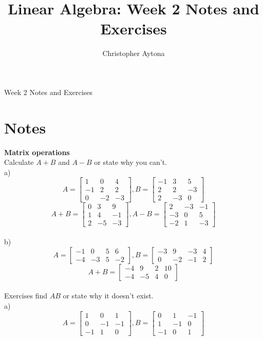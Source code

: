 \documentclass[a4paper]{article}
\title{Linear Algebra: Week 2 Notes and Exercises}
\author{Christopher Aytona}
\begin{document}
\begin{center}
\Huge{Week 2 Notes and Exercises}
\end{center}

\section{Notes}
\textbf{Matrix operations}\\

Calculate $A+B$ and $A-B$ or state why you can't.\\

a) \[ A=
\begin{bmatrix}
1&0&4\\
-1&2&2\\
0&-2&-3
\end{bmatrix},
B=
\begin{bmatrix}
-1&3&5\\
2&2&-3\\
2&-3&0
\end{bmatrix}
\]
\[ A+B=
\begin{bmatrix}
0&3&9\\
1&4&-1\\
2&-5&-3
\end{bmatrix},
A-B=
\begin{bmatrix}
2&-3&-1\\
-3&0&5\\
-2&1&-3
\end{bmatrix}
\]\\

b) \[ A=
\begin{bmatrix}
-1&0&5&6\\
-4&-3&5&-2
\end{bmatrix},
B=
\begin{bmatrix}
-3&9&-3&4\\
0&-2&-1&2
\end{bmatrix}
\]
\[ A+B=
\begin{bmatrix}
-4&9&2&10\\
-4&-5&4&0
\end{bmatrix}
\]\\

Exercises find $AB$ or state why it doesn't exist.\\

a) \[A=
\begin{bmatrix}
1&0&1\\
0&-1&-1\\
-1&1&0
\end{bmatrix},
B=
\begin{bmatrix}
0&1&-1\\
1&-1&0\\
-1&0&1
\end{bmatrix}
\]
\end{document}
